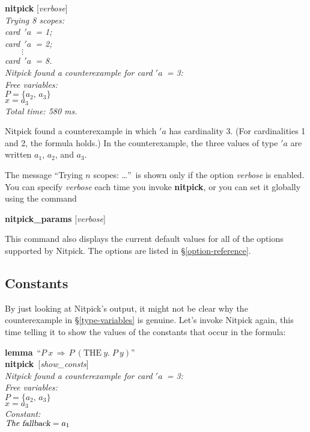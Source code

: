 \documentclass[a4paper,12pt]{article}
\begin{document}
\prew
\textbf{nitpick} [\textit{verbose}] \\[2\smallskipamount]
\slshape
Trying 8 scopes: \nopagebreak \\
\hbox{}\qquad \textit{card}~$'a$~= 1; \\
\hbox{}\qquad \textit{card}~$'a$~= 2; \\
\hbox{}\qquad $\qquad\vdots$ \\[.5\smallskipamount]
\hbox{}\qquad \textit{card}~$'a$~= 8. \\[2\smallskipamount]
Nitpick found a counterexample for \textit{card} $'a$~= 3: \\[2\smallskipamount]
\hbox{}\qquad Free variables: \nopagebreak \\
\hbox{}\qquad\qquad $P = \{a_2,\, a_3\}$ \\
\hbox{}\qquad\qquad $x = a_3$ \\[2\smallskipamount]
Total time: 580 ms.
\postw

Nitpick found a counterexample in which $'a$ has cardinality 3. (For
cardinalities 1 and 2, the formula holds.) In the counterexample, the three
values of type $'a$ are written $a_1$, $a_2$, and $a_3$.

The message ``Trying $n$ scopes: {\ldots}''\ is shown only if the option
\textit{verbose} is enabled. You can specify \textit{verbose} each time you
invoke \textbf{nitpick}, or you can set it globally using the command

\prew
\textbf{nitpick\_params} [\textit{verbose}]
\postw

This command also displays the current default values for all of the options
supported by Nitpick. The options are listed in \S\ref{option-reference}.

\subsection{Constants}
\label{constants}

By just looking at Nitpick's output, it might not be clear why the
counterexample in \S\ref{type-variables} is genuine. Let's invoke Nitpick again,
this time telling it to show the values of the constants that occur in the
formula:

\prew
\textbf{lemma}~``$P~x\,\Longrightarrow\, P~(\textrm{THE}~y.\;P~y)$'' \\
\textbf{nitpick}~[\textit{show\_consts}] \\[2\smallskipamount]
\slshape
Nitpick found a counterexample for \textit{card} $'a$~= 3: \\[2\smallskipamount]
\hbox{}\qquad Free variables: \nopagebreak \\
\hbox{}\qquad\qquad $P = \{a_2,\, a_3\}$ \\
\hbox{}\qquad\qquad $x = a_3$ \\
\hbox{}\qquad Constant: \nopagebreak \\
\hbox{}\qquad\qquad $\textit{The}~\textsl{fallback} = a_1$
\postw
\end{document}
